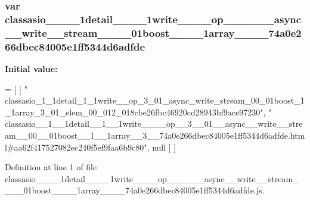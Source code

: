 \subsubsection[{classasio\+\_\+\+\_\+1\+\_\+\+\_\+1detail\+\_\+\+\_\+1\+\_\+\+\_\+1write\+\_\+\+\_\+\+\_\+\+\_\+op\+\_\+\+\_\+3\+\_\+\+\_\+01\+\_\+\+\_\+async\+\_\+\+\_\+write\+\_\+\+\_\+stream\+\_\+\+\_\+00\+\_\+\+\_\+01boost\+\_\+\+\_\+1\+\_\+\+\_\+1array\+\_\+\+\_\+3\+\_\+\+\_\+74a0e266dbec84005e1ff5344d6adfde}]{\setlength{\rightskip}{0pt plus 5cm}var classasio\+\_\+\+\_\+\_\+\+\_\+1detail\+\_\+\+\_\+\_\+\+\_\+1write\+\_\+\+\_\+\+\_\+\+\_\+op\+\_\+\+\_\+\_\+\+\_\+\_\+\+\_\+async\+\_\+\+\_\+write\+\_\+\+\_\+stream\+\_\+\+\_\+\_\+\+\_\+01boost\+\_\+\+\_\+\_\+\+\_\+1array\+\_\+\+\_\+\_\+\+\_\+74a0e266dbec84005e1ff5344d6adfde}\label{classasio____1____1detail____1____1write________op____3____01____async____write____stream____00_90909a2cb7f5d39d792da4dbaf0ee177_a12275d2d3a5138867265f451c16af93c}
{\bfseries Initial value\+:}
\begin{DoxyCode}
=
[
    [ \textcolor{stringliteral}{"
      classasio\_1\_1detail\_1\_1write\_\_op\_3\_01\_async\_write\_stream\_00\_01boost\_1\_1array\_3\_01\_elem\_00\_012\_018cbe26fbc46920cd28943bf9ace97230"}, \textcolor{stringliteral}{"
      classasio\_\_1\_\_1detail\_\_1\_\_1write\_\_\_\_op\_\_3\_\_01\_\_async\_\_write\_\_stream\_\_00\_\_01boost\_\_1\_\_1array\_\_3\_\_74a0e266dbec84005e1ff5344d6adfde.html#aa62f417527082ec240f5ef9faa6b9c80"}, null ]
]
\end{DoxyCode}


Definition at line 1 of file classasio\+\_\+\+\_\+\_\+\+\_\+1detail\+\_\+\+\_\+\_\+\+\_\+1write\+\_\+\+\_\+\+\_\+\+\_\+op\+\_\+\+\_\+\_\+\+\_\+\_\+\+\_\+async\+\_\+\+\_\+write\+\_\+\+\_\+stream\+\_\+\+\_\+\_\+\+\_\+01boost\+\_\+\+\_\+\_\+\+\_\+1array\+\_\+\+\_\+\_\+\+\_\+74a0e266dbec84005e1ff5344d6adfde.\+js.

